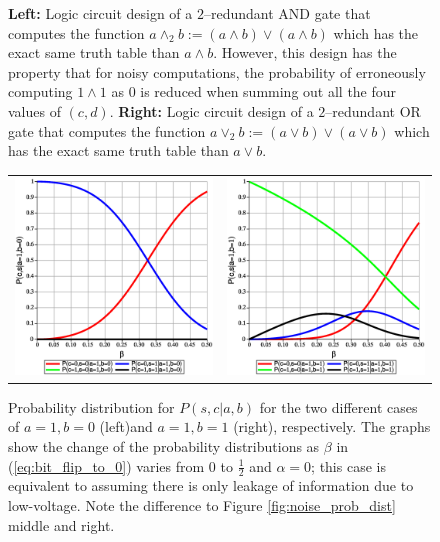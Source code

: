 \begin{figure}
\begin{minipage}[c]{.45\linewidth}
    \end{minipage}
    \caption{{\bf Left:} Logic circuit design of a $2$--redundant AND gate that computes the function $a \land_2 b := (a \land b) \lor (a \land b)$ which has the exact same truth table than $a \land b$. However, this design has the property that for noisy computations, the probability of erroneously computing $1 \land 1$ as $0$ is reduced when summing out all the four values of $(c,d)$. {\bf Right:} Logic circuit design of a $2$--redundant OR gate that computes the function $a \lor_2 b := (a \lor b) \lor (a \lor b)$ which has the exact same truth table than $a \lor b$.}
\end{figure}

\begin{figure}
    \begin{center}
        \begin{tabular}{cc}
            \includegraphics[width=.4\textwidth]{media/noisy_half_adder_16_redundancy_value_dist_10.eps} &
            \includegraphics[width=.4\textwidth]{media/noisy_half_adder_16_redundancy_value_dist_11.eps}
        \end{tabular}
    \end{center}
    \caption{Probability distribution for $P(s,c|a,b)$ for the two different cases of $a=1, b=0$ (left)and $a=1, b=1$ (right), respectively. The graphs show the change of the probability distributions as $\beta$ in (\ref{eq:bit_flip_to_0}) varies from $0$ to $\frac{1}{2}$ and $\alpha = 0$; this case is equivalent to assuming there is only leakage of information due to low-voltage. Note the difference to Figure \ref{fig:noise_prob_dist} middle and right. \label{fig:noise_prob_dist_redudancy}}
\end{figure}
